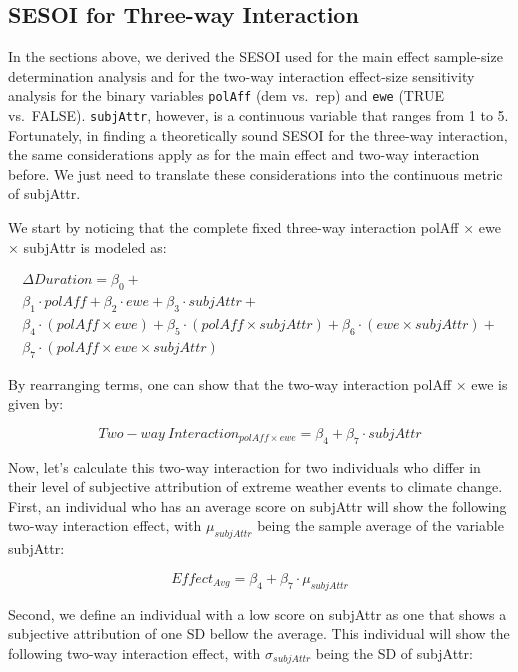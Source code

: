 \documentclass[
  letterpaper,
  DIV=11,
  numbers=noendperiod]{scrartcl}
\begin{document}
\subsection{SESOI for Three-way
Interaction}\label{sesoi-for-three-way-interaction}

In the sections above, we derived the SESOI used for the main effect
sample-size determination analysis and for the two-way interaction
effect-size sensitivity analysis for the binary variables
\texttt{polAff} (dem vs.~rep) and \texttt{ewe} (TRUE vs.~FALSE).
\texttt{subjAttr}, however, is a continuous variable that ranges from 1
to 5. Fortunately, in finding a theoretically sound SESOI for the
three-way interaction, the same considerations apply as for the main
effect and two-way interaction before. We just need to translate these
considerations into the continuous metric of subjAttr.

We start by noticing that the complete fixed three-way interaction
polAff × ewe × subjAttr is modeled as:

\[
\begin{split}
\Delta Duration = \beta_{0} + \\
\beta_{1} \cdot polAff + \beta_{2} \cdot ewe + \beta_{3} \cdot subjAttr + \\
\beta_{4} \cdot (polAff \times ewe) + \beta_{5} \cdot (polAff \times subjAttr) + \beta_{6} \cdot (ewe \times subjAttr) + \\
\beta_{7} \cdot (polAff \times ewe \times subjAttr)
\end{split}
\]

By rearranging terms, one can show that the two-way interaction polAff ×
ewe is given by:

\[
Two{-}way\ Interaction_{polAff \times ewe} = \beta_{4} + \beta_{7} \cdot subjAttr
\]

Now, let's calculate this two-way interaction for two individuals who
differ in their level of subjective attribution of extreme weather
events to climate change. First, an individual who has an average score
on subjAttr will show the following two-way interaction effect, with
\(\mu_{subjAttr}\) being the sample average of the variable subjAttr:

\[
Effect_{Avg} = \beta_{4} + \beta_{7} \cdot \mu_{subjAttr}
\]

Second, we define an individual with a low score on subjAttr as one that
shows a subjective attribution of one SD bellow the average. This
individual will show the following two-way interaction effect, with
\(\sigma_{subjAttr}\) being the SD of subjAttr:
\end{document}
